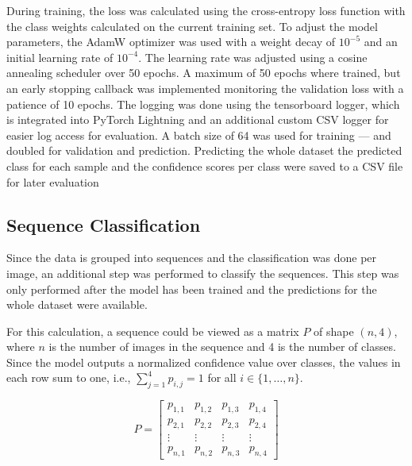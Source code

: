     During training, the loss was calculated using the cross-entropy loss function with the class weights calculated on the current training set.
    To adjust the model parameters, the AdamW optimizer \autocite{loshchilovDecoupledWeightDecay2019} was used with a weight decay of \(10^{-5}\) and an initial learning rate of \(10^{-4}\).
    The learning rate was adjusted using a cosine annealing scheduler \autocite{loshchilovSGDRStochasticGradient2017} over 50 epochs.
    A maximum of 50 epochs where trained, but an early stopping callback was implemented monitoring the validation loss with a patience of 10 epochs.
    The logging was done using the tensorboard logger, which is integrated into PyTorch Lightning and an additional custom \ac{CSV} logger for easier log access for evaluation.
    A batch size of 64 was used for training --- and doubled for validation and prediction.
    Predicting the whole dataset the predicted class for each sample and the confidence scores per class were saved to a \ac{CSV} file for later evaluation

    \subsection{Sequence Classification}
    Since the data is grouped into sequences and the classification was done per image, an additional step was performed to classify the sequences.
    This step was only performed after the model has been trained and the predictions for the whole dataset were available.

    For this calculation, a sequence could be viewed as a matrix \( P \) of shape \((n, 4)\), where \(n\) is the number of images in the sequence and 4 is the number of classes.
    Since the model outputs a normalized confidence value over classes, the values in each row sum to one, i.e., \( \sum_{j=1}^{4} p_{i,j} = 1 \) for all \( i \in \{1, \ldots, n\} \).

    \begin{equation}
    P = 
    \begin{bmatrix}
    p_{1,1} & p_{1,2} & p_{1,3} & p_{1,4} \\
    p_{2,1} & p_{2,2} & p_{2,3} & p_{2,4} \\
    \vdots  & \vdots  & \vdots  & \vdots  \\
    p_{n,1} & p_{n,2} & p_{n,3} & p_{n,4}
    \end{bmatrix}
    \label{eq:sequence_matrix}
    \end{equation}

